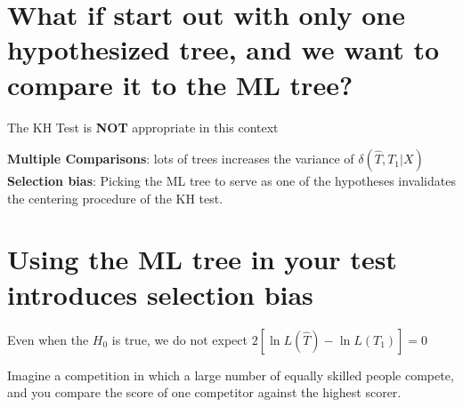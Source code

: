 \documentclass[landscape]{foils}
\begin{document}
\myNewSlide
\section*{What if start out with only one hypothesized tree, and we want to compare it to the ML tree?}
The KH Test is {\bf NOT} appropriate in this context \citep[see][for discussion of this point]{GoldmanAR2000}
	
{\bf Multiple Comparisons}: lots of trees increases the variance of $\delta(\hat{T},T_1|X)$\\

{\bf Selection bias}: Picking the ML tree to serve as one of the hypotheses invalidates the centering procedure of the KH test.

\myNewSlide
\section*{Using the ML tree in your test introduces selection bias}
Even when the $H_0$ is true, we do not expect $2\left[\ln L(\hat{T}) - \ln L(T_1)\right]= 0$

Imagine a competition in which a large number of equally skilled people compete, and you compare the score of one competitor against the highest scorer.
\end{document}
